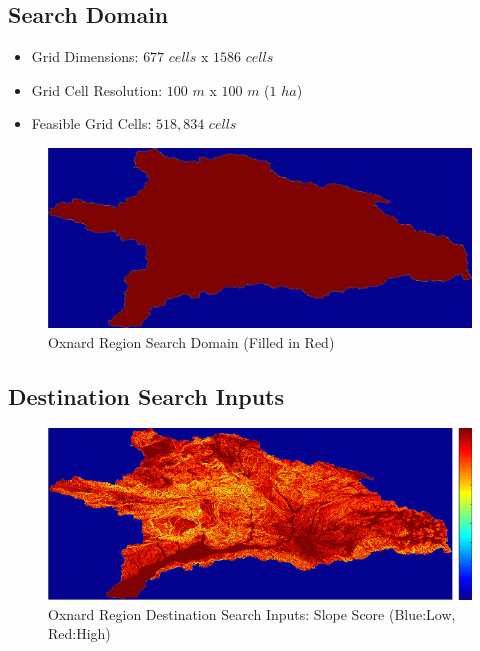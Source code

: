     \subsection{Search Domain}
    
    \begin{itemize}
      \setlength{\itemsep}{0cm}
      \setlength{\parskip}{0cm}
        \item Grid Dimensions: $677$ $cells$ x $1586$ $cells$
        \item Grid Cell Resolution: $100$ $m$ x $100$ $m$ ($1$ $ha$)
        \item Feasible Grid Cells: $518,834$ $cells$
    \end{itemize}
    
        \begin{figure}[!h]
            \begin{center}
            \includegraphics[width=5.5in]{figures/Oxnard_SearchDomain.png}   
            \caption{Oxnard Region Search Domain (Filled in Red)}
            \label{fig:Odomain}
            \end{center}
        \end{figure}
        
    \subsection{Destination Search Inputs}
    
        \begin{figure}[!h]
            \begin{center}
            \includegraphics[width=5.5in]{figures/Oxnard_Search_Slope.png}   
            \caption{Oxnard Region Destination Search Inputs: Slope Score (Blue:Low, Red:High)}
            \label{fig:Odsinputs_slope}
            \end{center}
        \end{figure}
        
